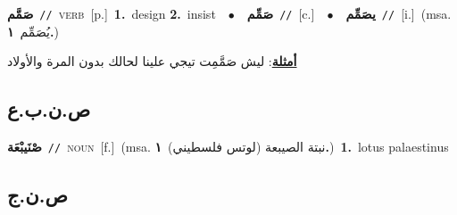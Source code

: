 \documentclass[10pt,a4paper,twoside]{article} %
\begin{document}
\begin{multicols}{2}
{\setlength\topsep{0pt}\textbf{\foreignlanguage{arabic}{صَمَّم}}\ {\color{gray}\texttt{//}\color{black}}\ \textsc{verb}\ [p.]\ \textbf{1.}~design  \textbf{2.}~insist\ \ $\bullet$\ \ \setlength\topsep{0pt}\textbf{\foreignlanguage{arabic}{صَمِّم}}\ {\color{gray}\texttt{//}\color{black}}\ [c.]\ \ $\bullet$\ \ \setlength\topsep{0pt}\textbf{\foreignlanguage{arabic}{يصَمِّم}}\ {\color{gray}\texttt{//}\color{black}}\ [i.]\ \color{gray}(msa. \foreignlanguage{arabic}{يُصَمِّم}~\foreignlanguage{arabic}{\textbf{١.}})\color{black}\  \begin{flushright}\color{gray}\foreignlanguage{arabic}{\textbf{\underline{\foreignlanguage{arabic}{أمثلة}}}: ليش صَمَّمِت تيجي علينا لحالك بدون المرة والأولاد}\end{flushright}\color{black}} \vspace{2mm}

\vspace{-3mm}
\subsection*{\color{blue}\foreignlanguage{arabic}{ص.ن.ب.ع}\color{blue}{ (ntws)}} 

{\setlength\topsep{0pt}\textbf{\foreignlanguage{arabic}{صْنَيبْعَة}}\ {\color{gray}\texttt{//}\color{black}}\ \textsc{noun}\ [f.]\ \color{gray}(msa. \foreignlanguage{arabic}{نبتة الصيبعة (لوتس فلسطيني)}~\foreignlanguage{arabic}{\textbf{١.}})\color{black}\ \textbf{1.}~lotus palaestinus\ } \vspace{2mm}

\vspace{-3mm}
\subsection*{\color{blue}\foreignlanguage{arabic}{ص.ن.ج}\color{blue}{}} 


\end{multicols}
\end{document}

